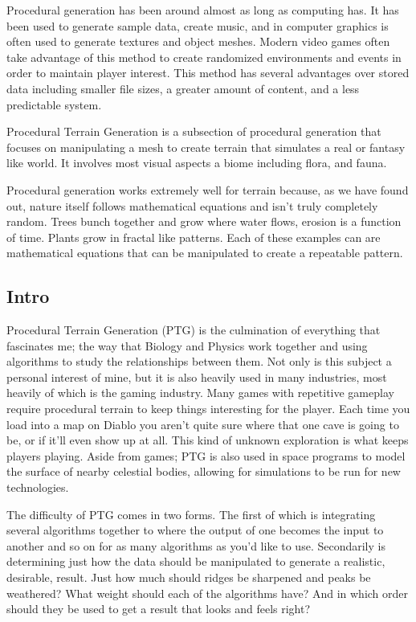 \documentclass[12pt]{article}
\begin{document}
        Procedural generation has been around almost as long as computing has. It has been used to generate sample data, 
        create music, and in computer graphics is often used to generate textures and object meshes. Modern video games 
        often take advantage of this method to create randomized environments and events in order to maintain player interest.
        This method has several advantages over stored data including smaller file sizes, a greater amount of content, 
        and a less predictable system.

        Procedural Terrain Generation is a subsection of procedural generation that focuses on manipulating
        a mesh to create terrain that simulates a real or fantasy like world. It involves most visual aspects a biome 
        including flora, and fauna.

        Procedural generation works extremely well for terrain because, as we have found out, nature itself follows 
        mathematical equations and isn't truly completely random. Trees bunch together and grow where water flows,
        erosion is a function of time. Plants grow in fractal like patterns. Each of these examples can are mathematical 
        equations that can be manipulated to create a repeatable pattern.

    \subsection{Intro}

        Procedural Terrain Generation (PTG) is the culmination of everything that fascinates me; the way that Biology and 
        Physics work together and using algorithms to study the relationships between them. Not only is this subject a 
        personal interest of mine, but it is also heavily used in many industries, most heavily of which is the gaming 
        industry. Many games with repetitive gameplay require procedural terrain to keep things interesting for the player. 
        Each time you load into a map on Diablo you aren't quite sure where that one cave is going to be, or if it'll 
        even show up at all. This kind of unknown exploration is what keeps players playing.  Aside from games; PTG is 
        also used in space programs to model the surface of nearby celestial bodies, allowing for simulations to be run 
        for new technologies.

        The difficulty of PTG comes in two forms. The first of which is integrating several algorithms together to where 
        the output of one becomes the input to another and so on for as many algorithms as you'd like to use. Secondarily 
        is determining just how the data should be manipulated to generate a realistic, desirable, result.  Just how much 
        should ridges be sharpened and peaks be weathered? What weight should each of the algorithms have? And in which 
        order should they be used to get a result that looks and feels right?
\end{document}
